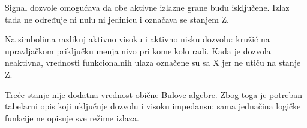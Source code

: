 Signal dozvole omogućava da obe aktivne izlazne grane budu isključene. Izlaz tada ne određuje ni nulu ni jedinicu i označava se stanjem Z.

Na simbolima razlikuj aktivno visoku i aktivno nisku dozvolu: kružić na upravljačkom priključku menja nivo pri kome kolo radi. Kada je dozvola neaktivna, vrednosti funkcionalnih ulaza označene su sa X jer ne utiču na stanje Z.

Treće stanje nije dodatna vrednost obične Bulove algebre. Zbog toga je potreban tabelarni opis koji uključuje dozvolu i visoku impedansu; sama jednačina logičke funkcije ne opisuje sve režime izlaza.
